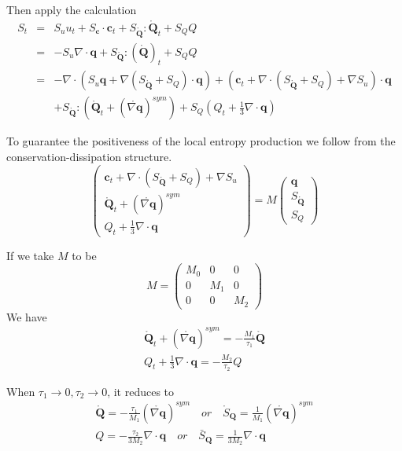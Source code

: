 \documentclass[a4paper]{article}
\begin{document}
Then apply the calculation
\begin{eqnarray}
S_t &=& S_u u_t +S_{\mathbf{c}} \cdot \mathbf{c}_t + S_{\mathring{\mathbf{Q}}}:\mathring{\mathbf{Q}}_t+S_Q Q \\
    &=& -S_u \nabla \cdot \mathbf{q} + S_{\mathring{\mathbf{Q}}}:(\mathring{\mathbf{Q}})_t+S_QQ \\
    &=& -\nabla \cdot (S_u \mathbf{q}+\nabla (S_{\mathring{\mathbf{Q}}}+S_Q) \cdot \mathbf{q})+(\mathbf{c}_t+\nabla \cdot (S_{\mathring{\mathbf{Q}}}+S_Q)+\nabla S_u) \cdot \mathbf{q} \\
&& +S_{\mathring{\mathbf{Q}}}:(\mathring{\mathbf{Q}}_t+(\mathring{\nabla \mathbf{q}})^{sym})+S_Q(Q_t+\frac{1}{3}\nabla \cdot \mathbf{q})
\end{eqnarray}

To guarantee the positiveness of the local entropy production we follow from the conservation-dissipation structure.
\begin{equation}
\left( \begin{array}{ll} \mathbf{c}_t+\nabla \cdot (S_{\mathring{\mathbf{Q}}}+S_Q)+\nabla S_u \\ \mathring{\mathbf{Q}}_t+(\mathring{\nabla \mathbf{q}})^{sym} \\ Q_t+\frac{1}{3} \nabla \cdot \mathbf{q} \end{array} \right) = M \left( \begin{array}{l} \mathbf{q} \\ S_{\mathring{\mathbf{Q}}} \\S_Q \end{array} \right) 
\end{equation}

If we take $M$ to be 
\begin{equation}
M=\left( \begin{array}{lll} M_0 & 0 & 0 \\0 & M_1 & 0 \\0 & 0 & M_2 \end{array} \right)
\end{equation}
We have
\begin{eqnarray}
\mathring{\mathbf{Q}}_t+(\mathring{\nabla \mathbf{q}})^{sym}=-\frac{M_1}{\tau_1}\mathring{\mathbf{Q}} \\
Q_t+\frac{1}{3} \nabla \cdot \mathbf{q}=-\frac{M_2}{\tau_2}Q
\end{eqnarray}

When $\tau_1 \to 0, \tau_2 \to 0$, it reduces to
\begin{eqnarray} 
\mathring{\mathbf{Q}}=-\frac{\tau_1}{M_1}(\mathring{\nabla \mathbf{q}})^{sym} \quad  or \quad \mathring{S}_\mathbf{Q}=\frac{1}{M_1}(\mathring{\nabla \mathbf{q}})^{sym} \\
Q=-\frac{\tau_2}{3M_2}\nabla \cdot \mathbf{q} \quad or \quad \bar{S}_\mathbf{Q}=\frac{1}{3M_2} \nabla \cdot \mathbf{q}
\end{eqnarray}
\end{document}
